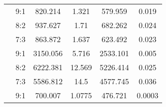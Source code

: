 \documentclass{ieeeojies}
\begin{document}
\begin{table}[H]
\begin{tabular}{|c|c|c|c|c|c|}
\rowcolor[HTML]{FFB6AF} 
\cellcolor[HTML]{FFB6AF}{\color[HTML]{000000} }                                                                                         & {\color[HTML]{000000} 9:1}            & {\color[HTML]{000000} 820.214}       & {\color[HTML]{000000} 1.321}         & {\color[HTML]{000000} 579.959}      & {\color[HTML]{000000} 0.019}         \\ \cline{2-6} 
\rowcolor[HTML]{FFB6AF} 
\cellcolor[HTML]{FFB6AF}{\color[HTML]{000000} }                                                                                         & {\color[HTML]{000000} 8:2}            & {\color[HTML]{000000} 937.627}       & {\color[HTML]{000000} 1.71}          & {\color[HTML]{000000} 682.262}      & {\color[HTML]{000000} 0.024}         \\ \cline{2-6} 
\rowcolor[HTML]{FFB6AF} 
\multirow{-3}{*}{\cellcolor[HTML]{FFB6AF}{\color[HTML]{000000} \textbf{GNN}}}                                                           & {\color[HTML]{000000} 7:3}            & {\color[HTML]{000000} 863.872}       & {\color[HTML]{000000} 1.637}         & {\color[HTML]{000000} 623.492}      & {\color[HTML]{000000} 0.023}         \\ \hline
\rowcolor[HTML]{FBC193} 
\cellcolor[HTML]{FBC193}{\color[HTML]{000000} }                                                                                         & {\color[HTML]{000000} 9:1}            & {\color[HTML]{000000} 3150.056}      & {\color[HTML]{000000} 5.716}         & {\color[HTML]{000000} 2533.101}     & {\color[HTML]{000000} 0.005}         \\ \cline{2-6} 
\rowcolor[HTML]{FBC193} 
\cellcolor[HTML]{FBC193}{\color[HTML]{000000} }                                                                                         & {\color[HTML]{000000} 8:2}            & {\color[HTML]{000000} 6222.381}      & {\color[HTML]{000000} 12.569}        & {\color[HTML]{000000} 5226.414}     & {\color[HTML]{000000} 0.025}         \\ \cline{2-6} 
\rowcolor[HTML]{FBC193} 
\multirow{-3}{*}{\cellcolor[HTML]{FBC193}{\color[HTML]{000000} \textbf{XGBoost}}}                                                       & {\color[HTML]{000000} 7:3}            & {\color[HTML]{000000} 5586.812}      & {\color[HTML]{000000} 14.5}          & {\color[HTML]{000000} 4577.745}     & {\color[HTML]{000000} 0.036}         \\ \hline
\rowcolor[HTML]{FFB6AF} 
\cellcolor[HTML]{FFB6AF}{\color[HTML]{000000} }                                                                                         & {\color[HTML]{FE0000} 9:1}            & {\color[HTML]{FE0000} 700.007}       & {\color[HTML]{FE0000} 1.0775}        & {\color[HTML]{FE0000} 476.721}      & {\color[HTML]{FE0000} 0.0003}        \\ \cline{2-6} 

\end{tabular}
\end{table}
\end{document}
